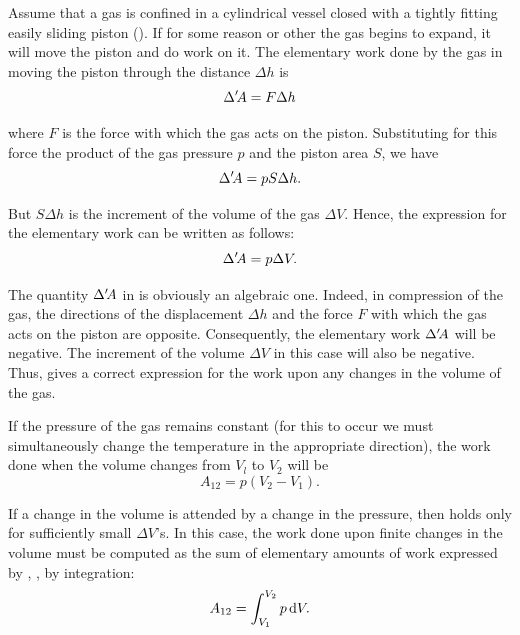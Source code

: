 Assume that a gas is confined in a cylindrical vessel closed with a tightly fitting easily sliding piston (). If for some reason or other the gas begins to expand, it will move the piston and do work on it. The elementary work done by the gas in moving the piston through the distance $\Delta h$ is
\begin{equation*}
	\Delta'\!A = F \Delta h
\end{equation*}

\noindent
where $F$ is the force with which the gas acts on the piston. Substituting for this force the product of the gas pressure $p$ and the piston area $S$, we have
\begin{equation*}
	\Delta'\!A = p S \Delta h.
\end{equation*}

\noindent
But $S\Delta h$ is the increment of the volume of the gas $\Delta V$. Hence, the expression for the elementary work can be written as follows:
\begin{equation}\label{eq:10_10}
	\Delta'\!A = p\Delta V.
\end{equation}

The quantity $\Delta'\!A$ in  is obviously an algebraic one. Indeed, in compression of the gas, the directions of the displacement $\Delta h$ and the force $F$ with which the gas acts on the piston are opposite. Consequently, the elementary work $\Delta'\!A$ will be negative. The increment of the volume $\Delta V$ in this case will also be negative. Thus,  gives a correct expression for the work upon any changes in the volume of the gas.

If the pressure of the gas remains constant (for this to occur we must simultaneously change the temperature in the appropriate direction), the work done when the volume changes from $V_l$ to $V_2$ will be
\begin{equation}\label{eq:10_11}
	A_{12} = p(V_2 - V_1).
\end{equation}

\noindent
If a change in the volume is attended by a change in the pressure, then  holds only for sufficiently small $\Delta V$'s. In this case, the work done upon finite changes in the volume must be computed as the sum of elementary amounts of work expressed by , \ie, by integration:
\begin{equation}\label{eq:10_12}
	A_{12} = \int_{V_1}^{V_2} p\,\mathrm{d} V.
\end{equation}

